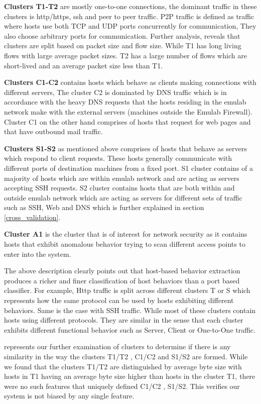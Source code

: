 \textbf{Clusters T1-T2} are mostly one-to-one connections, the dominant traffic in these clusters is http/https, ssh and peer to peer traffic. P2P traffic is defined as traffic where hosts use both TCP and UDP ports concurrently for communication, They also choose arbitrary ports for communication. Further analysis, reveals that clusters are split based on packet size and flow size.
While T1 has long living flows with large average packet sizes. T2 has a large number of flows which are short-lived and an average packet size less than T1.

\textbf{Clusters C1-C2} contains hosts which behave as clients  making connections with different servers, The cluster C2 is dominated by DNS traffic which is in accordance with the heavy DNS requests that the hosts residing in the emulab network make with the external servers (machines outside the Emulab Firewall). Cluster C1 on the other hand comprises of hosts that request for web pages and that have outbound mail traffic.

\textbf{Clusters S1-S2} as mentioned above comprises of hosts that behave as servers which respond to client requests. These hosts generally communicate with different ports of destination machines from a fixed port. S1 cluster contains of a majority of hosts which are within emulab network and are acting as servers accepting SSH requests. S2 cluster contains hosts that are both within and outside emulab network which are acting as servers for different sets of traffic such as SSH, Web and DNS which is further explained in section \ref{cross_validation}. 

\textbf{Cluster A1} is the cluster that is of interest for network security as it contains  hosts that exhibit anomalous behavior trying to scan different access points to enter into the system.

The above description clearly points out that host-based behavior extraction produces a richer and finer classification of host behaviors than a port based classifier. For example, Http traffic is split across different clusters T or S which represents how the same protocol can be used by hosts exhibiting different behaviors. Same is the case with SSH traffic. While most of these clusters contain hosts using different protocols. They are similar in the sense that each cluster exhibits different functional behavior such as Server, Client or One-to-One traffic.

 represents our further examination of clusters to determine if there is any similarity in the way the clusters T1/T2 , C1/C2 and S1/S2 are formed. While we found that the clusters T1/T2 are distinguished by average byte size with hosts in T1 having an average byte size higher than hosts in the cluster T1, there were no such features that uniquely defined C1/C2 , S1/S2. This verifies our system is not biased by any single feature.


